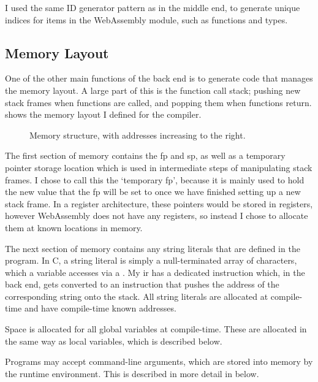 \documentclass[00-main.tex]{subfiles}
\begin{document}
I used the same ID generator pattern as in the middle end, to generate unique indices for items in the WebAssembly module, such as functions and types.

\subsection{Memory Layout}

One of the other main functions of the back end is to generate code that manages the memory layout.
A large part of this is the function call stack; pushing new stack frames when functions are called, and popping them when functions return.
 shows the memory layout I defined for the compiler.

\begin{figure}[ht]
  \centering
  \caption{Memory structure, with addresses increasing to the right.}
  \label{fig:memory structure} %
\end{figure}

The first section of memory contains the \gls{fp} and \gls{sp}, as well as a temporary pointer storage location which is used in intermediate steps of manipulating stack frames.
I chose to call this the `temporary \gls{fp}', because it is mainly used to hold the new value that the \gls{fp} will be set to once we have finished setting up a new stack frame.
In a register architecture, these pointers would be stored in registers, however WebAssembly does not have any registers, so instead I chose to allocate them at known locations in memory.

The next section of memory contains any string literals that are defined in the program.
In C, a string literal is simply a null-terminated array of characters, which a variable accesses via a .
My \gls{ir} has a dedicated  instruction which, in the back end, gets converted to an instruction that pushes the address of the corresponding string onto the stack.
All string literals are allocated at compile-time and have compile-time known addresses.

Space is allocated for all global variables at compile-time.
These are allocated in the same way as local variables, which is described below.

Programs may accept command-line arguments, which are stored into memory by the runtime environment.
This is described in more detail in  below.
\end{document}
